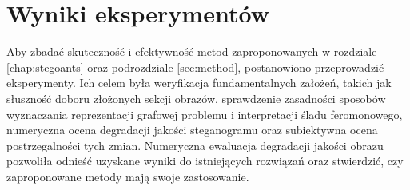 \chapter{Wyniki eksperymentów}\label{chap:results}
{

    Aby zbadać skuteczność i efektywność metod zaproponowanych w rozdziale \ref{chap:stegoants} oraz podrozdziale
    \ref{sec:method}, postanowiono przeprowadzić eksperymenty. Ich celem była weryfikacja fundamentalnych założeń,
    takich jak słuszność doboru złożonych sekcji obrazów, sprawdzenie zasadności sposobów wyznaczania reprezentacji
    grafowej problemu i interpretacji śladu feromonowego, numeryczna ocena degradacji jakości steganogramu oraz
    subiektywna ocena postrzegalności tych zmian. Numeryczna ewaluacja degradacji jakości obrazu pozwoliła odnieść
    uzyskane wyniki do istniejących rozwiązań oraz stwierdzić, czy zaproponowane metody mają swoje zastosowanie.

}
